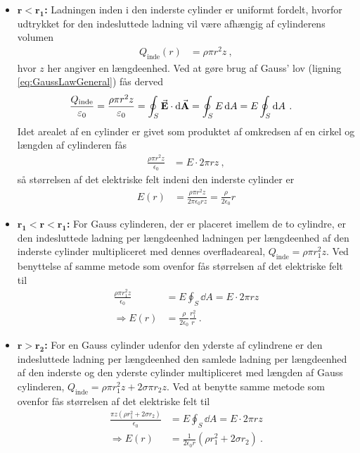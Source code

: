 \begin{itemize}
    \item $\mathbf{r < r_1}$\textbf{:} Ladningen inden i den inderste cylinder er uniformt fordelt, hvorfor udtrykket for den indesluttede ladning vil være afhængig af cylinderens volumen
    \begin{align}
        Q_{\text{inde}}(r) &= \rho\pi r^2 z \: ,
    \end{align}
    hvor $z$ her angiver en længdeenhed.
    Ved at gøre brug af Gauss' lov (ligning \eqref{eq:GaussLawGeneral}) fås derved
    \begin{align}
        \frac{Q_{\text{inde}}}{\varepsilon_0} &= \frac{\rho\pi r^2 z}{\varepsilon_0}
            = \oint_S \va{E} \cdot \dd{\va{A}}
            = \oint_S E \dd{A}
            = E \oint_S \dd{A} \: .
    \end{align}
    Idet arealet af en cylinder er givet som produktet af omkredsen af en cirkel og længden af cylinderen fås
    \begin{align}
        \frac{\rho\pi r^2 z}{\epsilon_0} &= E \cdot 2\pi r z \: ,
    \end{align}
    så størrelsen af det elektriske felt indeni den inderste cylinder er
    \begin{align}
        E(r) &= \frac{\rho\pi r^2 z}{2\pi\epsilon_0 r z}
            = \frac{\rho}{2\epsilon_0}r
    \end{align}
    \item $\mathbf{r_1 < r < r_1}$\textbf{:} For Gauss cylinderen, der er placeret imellem de to cylindre, er den indesluttede ladning per længdeenhed ladningen per længdeenhed af den inderste cylinder multipliceret med dennes overfladeareal, $Q_{\text{inde}} = \rho \pi r_1^2 z$. Ved benyttelse af samme metode som ovenfor fås størrelsen af det elektriske felt til
    \begin{align}
        \frac{\rho \pi r_1^2 z}{\epsilon_0} &= E \oint_S \dd{A}
            = E \cdot 2\pi r z \\
        \Rightarrow E(r) &= \frac{\rho}{2\epsilon_0}\frac{r_1^2}{r} \: .
    \end{align}
    \item $\mathbf{r > r_2}$\textbf{:} For en Gauss cylinder udenfor den yderste af cylindrene er den indesluttede ladning per længdeenhed den samlede ladning per længdeenhed af den inderste og den yderste cylinder multipliceret med længden af Gauss cylinderen, $Q_{\text{inde}} = \rho \pi r_1^2 z + 2 \sigma \pi r_2 z$. Ved at benytte samme metode som ovenfor fås størrelsen af det elektriske felt til
    \begin{align}
        \frac{\pi z \left(\rho r_1^2 + 2 \sigma r_2 \right)}{\epsilon_0} &= E \oint_S \dd{A}
            = E \cdot 2\pi r z \\
        \Rightarrow E(r) &= \frac{1}{2\epsilon_0 r}\left(\rho r_1^2 + 2\sigma r_2\right) \: .
    \end{align}
\end{itemize}




